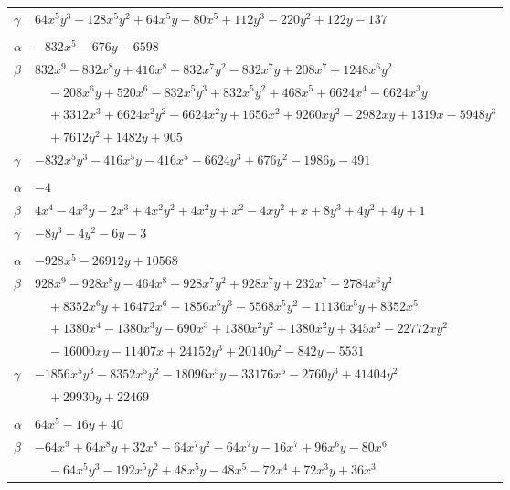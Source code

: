 \documentclass[11pt]{article}
\begin{document}
\begin{longtable}{@{}ll@{}}
$\gamma$ & $64x^{5}y^{3}-128x^{5}y^{2}+64x^{5}y-80x^{5}+112y^{3}-220y^{2}+122y-137$\\
\addlinespace[3pt]
\multicolumn{2}{@{}l}{$\{i,j\}=\{9,39\}$, $k_{ij}=2\cdot 3^{2}\cdot 17^{2}$}\\
$\alpha$ & $-832x^{5}-676y-6598$\\
$\beta$ & $832x^{9}-832x^{8}y+416x^{8}+832x^{7}y^{2}-832x^{7}y+208x^{7}+1248x^{6}y^{2}$\\
 & $\quad -208x^{6}y+520x^{6}-832x^{5}y^{3}+832x^{5}y^{2}+468x^{5}+6624x^{4}-6624x^{3}y$\\
 & $\quad +3312x^{3}+6624x^{2}y^{2}-6624x^{2}y+1656x^{2}+9260xy^{2}-2982xy+1319x-5948y^{3}$\\
 & $\quad +7612y^{2}+1482y+905$\\
$\gamma$ & $-832x^{5}y^{3}-416x^{5}y-416x^{5}-6624y^{3}+676y^{2}-1986y-491$\\
\addlinespace[3pt]
\multicolumn{2}{@{}l}{$\{i,j\}=\{10,17\}$, $k_{ij}=5$}\\
$\alpha$ & $-4$\\
$\beta$ & $4x^{4}-4x^{3}y-2x^{3}+4x^{2}y^{2}+4x^{2}y+x^{2}-4xy^{2}+x+8y^{3}+4y^{2}+4y+1$\\
$\gamma$ & $-8y^{3}-4y^{2}-6y-3$\\
\addlinespace[3pt]
\multicolumn{2}{@{}l}{$\{i,j\}=\{10,18\}$, $k_{ij}=2\cdot 5\cdot 7^{2}\cdot 13$}\\
$\alpha$ & $-928x^{5}-26912y+10568$\\
$\beta$ & $928x^{9}-928x^{8}y-464x^{8}+928x^{7}y^{2}+928x^{7}y+232x^{7}+2784x^{6}y^{2}$\\
 & $\quad +8352x^{6}y+16472x^{6}-1856x^{5}y^{3}-5568x^{5}y^{2}-11136x^{5}y+8352x^{5}$\\
 & $\quad +1380x^{4}-1380x^{3}y-690x^{3}+1380x^{2}y^{2}+1380x^{2}y+345x^{2}-22772xy^{2}$\\
 & $\quad -16000xy-11407x+24152y^{3}+20140y^{2}-842y-5531$\\
$\gamma$ & $-1856x^{5}y^{3}-8352x^{5}y^{2}-18096x^{5}y-33176x^{5}-2760y^{3}+41404y^{2}$\\
 & $\quad +29930y+22469$\\
\addlinespace[3pt]
\multicolumn{2}{@{}l}{$\{i,j\}=\{10,35\}$, $k_{ij}=2^{2}\cdot 11$}\\
$\alpha$ & $64x^{5}-16y+40$\\
$\beta$ & $-64x^{9}+64x^{8}y+32x^{8}-64x^{7}y^{2}-64x^{7}y-16x^{7}+96x^{6}y-80x^{6}$\\
 & $\quad -64x^{5}y^{3}-192x^{5}y^{2}+48x^{5}y-48x^{5}-72x^{4}+72x^{3}y+36x^{3}$\\

\end{longtable}
\end{document}
